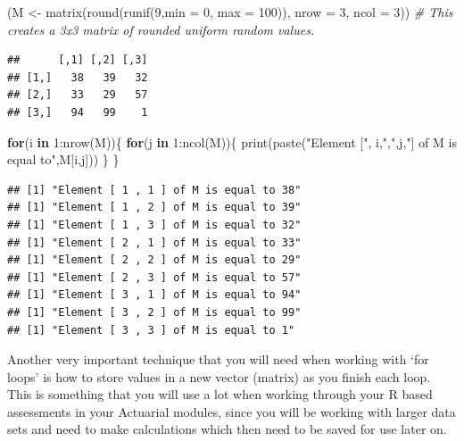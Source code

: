\documentclass[
]{book}
\newenvironment{Shaded}{\begin{snugshade}}{\end{snugshade}}
\newcommand{\AttributeTok}[1]{\textcolor[rgb]{0.77,0.63,0.00}{#1}}
\newcommand{\CommentTok}[1]{\textcolor[rgb]{0.56,0.35,0.01}{\textit{#1}}}
\newcommand{\ControlFlowTok}[1]{\textcolor[rgb]{0.13,0.29,0.53}{\textbf{#1}}}
\newcommand{\DecValTok}[1]{\textcolor[rgb]{0.00,0.00,0.81}{#1}}
\newcommand{\FunctionTok}[1]{\textcolor[rgb]{0.00,0.00,0.00}{#1}}
\newcommand{\NormalTok}[1]{#1}
\newcommand{\OtherTok}[1]{\textcolor[rgb]{0.56,0.35,0.01}{#1}}
\newcommand{\SpecialCharTok}[1]{\textcolor[rgb]{0.00,0.00,0.00}{#1}}
\newcommand{\StringTok}[1]{\textcolor[rgb]{0.31,0.60,0.02}{#1}}
\theoremstyle{definition}
\theoremstyle{definition}
\theoremstyle{definition}
\theoremstyle{definition}
\theoremstyle{remark}
\begin{document}
\begin{Shaded}
\begin{Highlighting}[]
\NormalTok{(M }\OtherTok{\textless{}{-}} \FunctionTok{matrix}\NormalTok{(}\FunctionTok{round}\NormalTok{(}\FunctionTok{runif}\NormalTok{(}\DecValTok{9}\NormalTok{,}\AttributeTok{min =} \DecValTok{0}\NormalTok{, }\AttributeTok{max =} \DecValTok{100}\NormalTok{)), }\AttributeTok{nrow =} \DecValTok{3}\NormalTok{, }\AttributeTok{ncol =} \DecValTok{3}\NormalTok{)) }\CommentTok{\# This creates a 3x3 matrix of rounded uniform random values. }
\end{Highlighting}
\end{Shaded}

\begin{verbatim}
##      [,1] [,2] [,3]
## [1,]   38   39   32
## [2,]   33   29   57
## [3,]   94   99    1
\end{verbatim}

\begin{Shaded}
\begin{Highlighting}[]
\ControlFlowTok{for}\NormalTok{(i }\ControlFlowTok{in} \DecValTok{1}\SpecialCharTok{:}\FunctionTok{nrow}\NormalTok{(M))\{}
  \ControlFlowTok{for}\NormalTok{(j }\ControlFlowTok{in} \DecValTok{1}\SpecialCharTok{:}\FunctionTok{ncol}\NormalTok{(M))\{}
    \FunctionTok{print}\NormalTok{(}\FunctionTok{paste}\NormalTok{(}\StringTok{"Element ["}\NormalTok{, i,}\StringTok{","}\NormalTok{,j,}\StringTok{"] of M is equal to"}\NormalTok{,M[i,j]))}
\NormalTok{    \}}
\NormalTok{\}}
\end{Highlighting}
\end{Shaded}

\begin{verbatim}
## [1] "Element [ 1 , 1 ] of M is equal to 38"
## [1] "Element [ 1 , 2 ] of M is equal to 39"
## [1] "Element [ 1 , 3 ] of M is equal to 32"
## [1] "Element [ 2 , 1 ] of M is equal to 33"
## [1] "Element [ 2 , 2 ] of M is equal to 29"
## [1] "Element [ 2 , 3 ] of M is equal to 57"
## [1] "Element [ 3 , 1 ] of M is equal to 94"
## [1] "Element [ 3 , 2 ] of M is equal to 99"
## [1] "Element [ 3 , 3 ] of M is equal to 1"
\end{verbatim}

Another very important technique that you will need when working with `for loops' is how to store values in a new vector (matrix) as you finish each loop. This is something that you will use a lot when working through your R based assessments in your Actuarial modules, since you will be working with larger data sets and need to make calculations which then need to be saved for use later on.
\end{document}
